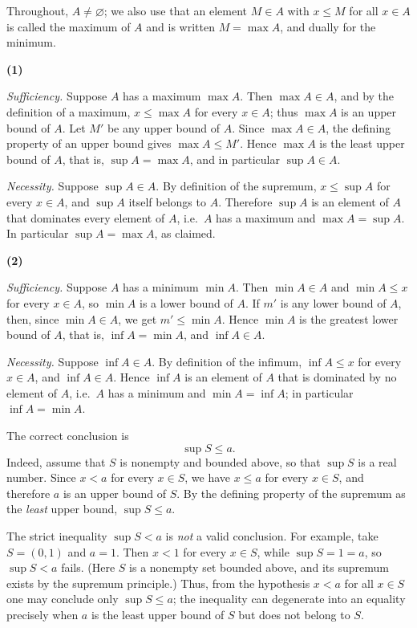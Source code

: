 \documentclass[11pt,a4paper]{article}
\newenvironment{solution}[1]{%
  \par\addvspace{1.7ex}%
  \noindent{\color{solutioncolor}\textbf{#1}}\hspace{0.55em}\ignorespaces}%
  {\par\addvspace{0.9ex}}
\begin{document}
\begin{solution}{Solution 2.4.2}\label{xs:2.4.2}
Throughout, $A \ne \varnothing$; we also use that an element $M \in A$ with $x \le M$ for all $x \in A$ is called the maximum of $A$ and is written $M = \max A$, and dually for the minimum.

\medskip
\noindent\textbf{(1)} 

\emph{Sufficiency.} Suppose $A$ has a maximum $\max A$. Then $\max A \in A$, and by the definition of a maximum, $x \le \max A$ for every $x \in A$; thus $\max A$ is an upper bound of $A$. Let $M'$ be any upper bound of $A$. Since $\max A \in A$, the defining property of an upper bound gives $\max A \le M'$. Hence $\max A$ is the least upper bound of $A$, that is, $\sup A = \max A$, and in particular $\sup A \in A$.

\emph{Necessity.} Suppose $\sup A \in A$. By definition of the supremum, $x \le \sup A$ for every $x \in A$, and $\sup A$ itself belongs to $A$. Therefore $\sup A$ is an element of $A$ that dominates every element of $A$, i.e.\ $A$ has a maximum and $\max A = \sup A$. In particular $\sup A = \max A$, as claimed.

\medskip
\noindent\textbf{(2)} 

\emph{Sufficiency.} Suppose $A$ has a minimum $\min A$. Then $\min A \in A$ and $\min A \le x$ for every $x \in A$, so $\min A$ is a lower bound of $A$. If $m'$ is any lower bound of $A$, then, since $\min A \in A$, we get $m' \le \min A$. Hence $\min A$ is the greatest lower bound of $A$, that is, $\inf A = \min A$, and $\inf A \in A$.

\emph{Necessity.} Suppose $\inf A \in A$. By definition of the infimum, $\inf A \le x$ for every $x \in A$, and $\inf A \in A$. Hence $\inf A$ is an element of $A$ that is dominated by no element of $A$, i.e.\ $A$ has a minimum and $\min A = \inf A$; in particular $\inf A = \min A$.
\end{solution}

\begin{solution}{Solution 2.4.3}\label{xs:2.4.3}
The correct conclusion is
\[
\sup S \le a .
\]
Indeed, assume that $S$ is nonempty and bounded above, so that $\sup S$ is a real number. Since $x < a$ for every $x \in S$, we have $x \le a$ for every $x \in S$, and therefore $a$ is an upper bound of $S$. By the defining property of the supremum as the \emph{least} upper bound, $\sup S \le a$.

The strict inequality $\sup S < a$ is \emph{not} a valid conclusion. For example, take $S = (0,1)$ and $a = 1$. Then $x < 1$ for every $x \in S$, while $\sup S = 1 = a$, so $\sup S < a$ fails. (Here $S$ is a nonempty set bounded above, and its supremum exists by the supremum principle.) Thus, from the hypothesis $x < a$ for all $x \in S$ one may conclude only $\sup S \le a$; the inequality can degenerate into an equality precisely when $a$ is the least upper bound of $S$ but does not belong to $S$.
\end{solution}
\end{document}
